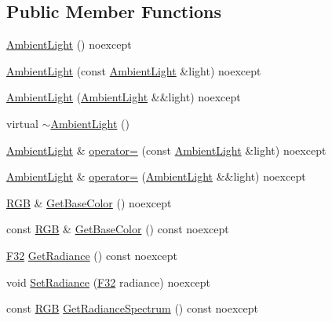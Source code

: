 \subsection*{Public Member Functions}
\begin{DoxyCompactItemize}
\item 
\mbox{\hyperlink{classmage_1_1rendering_1_1_ambient_light_a178327bf02552f65b98ad3858416a81d}{Ambient\+Light}} () noexcept
\item 
\mbox{\hyperlink{classmage_1_1rendering_1_1_ambient_light_a363ca4f79eef6f0a95a2e3d381479af1}{Ambient\+Light}} (const \mbox{\hyperlink{classmage_1_1rendering_1_1_ambient_light}{Ambient\+Light}} \&light) noexcept
\item 
\mbox{\hyperlink{classmage_1_1rendering_1_1_ambient_light_a8bd09baed470ce2c09af6a9893549937}{Ambient\+Light}} (\mbox{\hyperlink{classmage_1_1rendering_1_1_ambient_light}{Ambient\+Light}} \&\&light) noexcept
\item 
virtual \mbox{\hyperlink{classmage_1_1rendering_1_1_ambient_light_a811cb86e80188b924085674a88a0bf7b}{$\sim$\+Ambient\+Light}} ()
\item 
\mbox{\hyperlink{classmage_1_1rendering_1_1_ambient_light}{Ambient\+Light}} \& \mbox{\hyperlink{classmage_1_1rendering_1_1_ambient_light_a351cdcd2e1b25c6a44356060f0e61c2b}{operator=}} (const \mbox{\hyperlink{classmage_1_1rendering_1_1_ambient_light}{Ambient\+Light}} \&light) noexcept
\item 
\mbox{\hyperlink{classmage_1_1rendering_1_1_ambient_light}{Ambient\+Light}} \& \mbox{\hyperlink{classmage_1_1rendering_1_1_ambient_light_aa571cc046cb35ceafba6cb0a2ec4bd6c}{operator=}} (\mbox{\hyperlink{classmage_1_1rendering_1_1_ambient_light}{Ambient\+Light}} \&\&light) noexcept
\item 
\mbox{\hyperlink{structmage_1_1_r_g_b}{R\+GB}} \& \mbox{\hyperlink{classmage_1_1rendering_1_1_ambient_light_ad4e1f6726b09f690d2abcdfd536d3908}{Get\+Base\+Color}} () noexcept
\item 
const \mbox{\hyperlink{structmage_1_1_r_g_b}{R\+GB}} \& \mbox{\hyperlink{classmage_1_1rendering_1_1_ambient_light_a68266fb710e72997d9bb0a02d7f5d416}{Get\+Base\+Color}} () const noexcept
\item 
\mbox{\hyperlink{namespacemage_aa97e833b45f06d60a0a9c4fc22ae02c0}{F32}} \mbox{\hyperlink{classmage_1_1rendering_1_1_ambient_light_ad78278e798956e1c3a707a37dfb052da}{Get\+Radiance}} () const noexcept
\item 
void \mbox{\hyperlink{classmage_1_1rendering_1_1_ambient_light_a2da2e614906dc166121a0d0d391b9fc2}{Set\+Radiance}} (\mbox{\hyperlink{namespacemage_aa97e833b45f06d60a0a9c4fc22ae02c0}{F32}} radiance) noexcept
\item 
const \mbox{\hyperlink{structmage_1_1_r_g_b}{R\+GB}} \mbox{\hyperlink{classmage_1_1rendering_1_1_ambient_light_a480e6b39d92266254778c23e8456e55e}{Get\+Radiance\+Spectrum}} () const noexcept
\end{DoxyCompactItemize}

